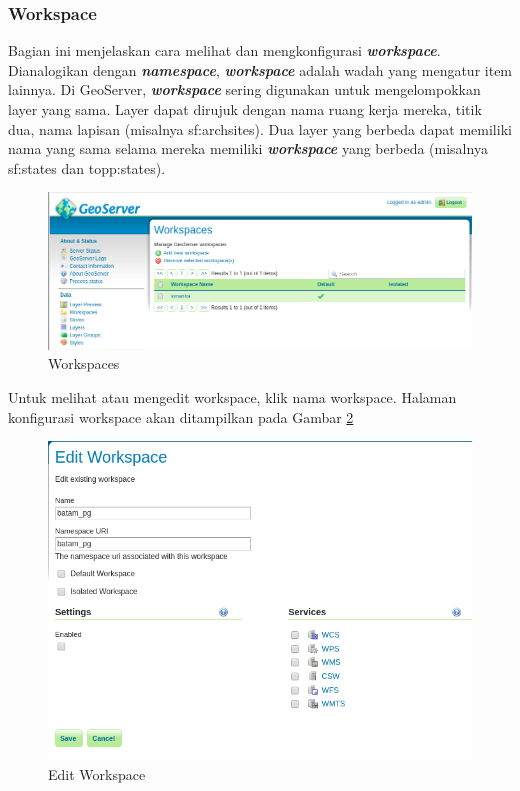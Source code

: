 \documentclass[]{book}
\begin{document}
\hypertarget{workspace}{%
\subsubsection{Workspace}\label{workspace}}

Bagian ini menjelaskan cara melihat dan mengkonfigurasi \textbf{\emph{workspace}}. Dianalogikan dengan \textbf{\emph{namespace}}, \textbf{\emph{workspace}} adalah wadah yang mengatur item lainnya. Di GeoServer, \textbf{\emph{workspace}} sering digunakan untuk mengelompokkan layer yang sama. Layer dapat dirujuk dengan nama ruang kerja mereka, titik dua, nama lapisan (misalnya sf:archsites). Dua layer yang berbeda dapat memiliki nama yang sama selama mereka memiliki \textbf{\emph{workspace}} yang berbeda (misalnya sf:states dan topp:states).

\begin{figure}

{\centering \includegraphics[width=0.6\linewidth]{images/08/gs7} 

}

\caption{Workspaces}\label{fig:gs7}
\end{figure}

Untuk melihat atau mengedit workspace, klik nama workspace. Halaman konfigurasi workspace akan ditampilkan pada Gambar \ref{fig:gs1}

\begin{figure}

{\centering \includegraphics[width=0.5\linewidth]{images/08/gs1} 

}

\caption{Edit Workspace}\label{fig:gs1}
\end{figure}
\end{document}
